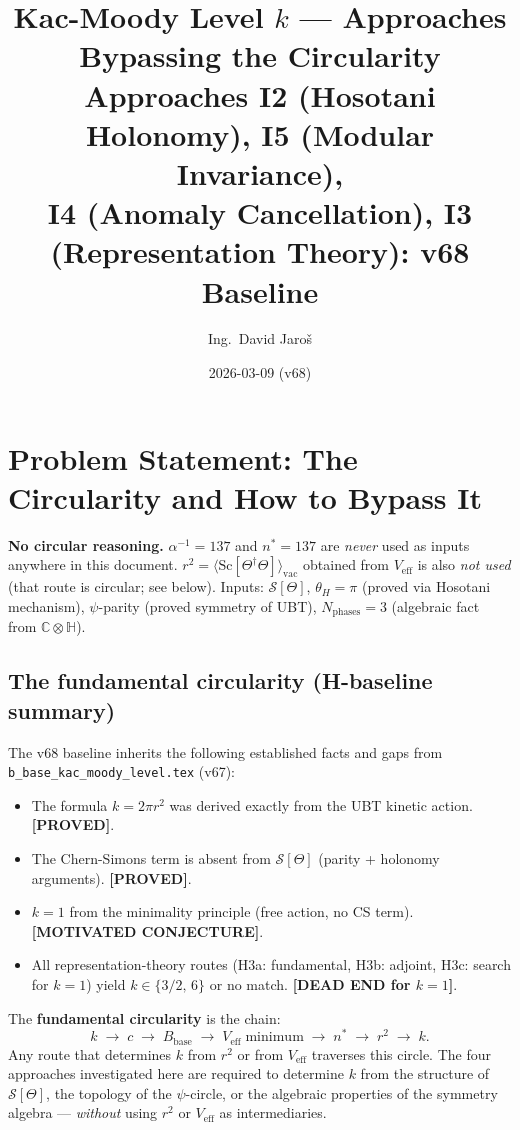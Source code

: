 \documentclass[11pt,a4paper]{article}
\title{Kac-Moody Level $k$ — Approaches Bypassing the Circularity\\
    \large Approaches I2 (Hosotani Holonomy), I5 (Modular Invariance),\\
    I4 (Anomaly Cancellation), I3 (Representation Theory): v68 Baseline}
\author{Ing.\ David Jaroš}
\date{2026-03-09 (v68)}
\theoremstyle{definition}
\theoremstyle{remark}
\begin{document}
  \maketitle
\fi

\section{Problem Statement: The Circularity and How to Bypass It}
\label{sec:intro}

\noindent\textbf{No circular reasoning.}
$\alpha^{-1} = 137$ and $n^* = 137$ are \emph{never} used as inputs
anywhere in this document.
$r^2 = \langle\mathrm{Sc}[\Theta^\dagger\Theta]\rangle_{\mathrm{vac}}$
obtained from $V_{\mathrm{eff}}$ is also \emph{not used} (that route
is circular; see below).
Inputs: $\mathcal{S}[\Theta]$, $\theta_H = \pi$ (proved via Hosotani
mechanism), $\psi$-parity (proved symmetry of UBT), $N_{\mathrm{phases}} = 3$
(algebraic fact from $\mathbb{C}\otimes\mathbb{H}$).

\subsection{The fundamental circularity (H-baseline summary)}

The v68 baseline inherits the following established facts and gaps from
\texttt{b\_base\_kac\_moody\_level.tex} (v67):

\begin{itemize}
  \item The formula $k = 2\pi r^2$ was derived exactly from the UBT
    kinetic action. \textbf{[PROVED]}.
  \item The Chern-Simons term is absent from $\mathcal{S}[\Theta]$
    (parity + holonomy arguments). \textbf{[PROVED]}.
  \item $k = 1$ from the minimality principle (free action,
    no CS term). \textbf{[MOTIVATED CONJECTURE]}.
  \item All representation-theory routes (H3a: fundamental, H3b: adjoint,
    H3c: search for $k=1$) yield $k \in \{3/2,\,6\}$ or no match.
    \textbf{[DEAD END for $k=1$]}.
\end{itemize}

The \textbf{fundamental circularity} is the chain:
\[
  k \;\longrightarrow\; c \;\longrightarrow\; B_{\mathrm{base}}
  \;\longrightarrow\; V_{\mathrm{eff}}\;\text{minimum}
  \;\longrightarrow\; n^* \;\longrightarrow\; r^2 \;\longrightarrow\; k.
\]
Any route that determines $k$ from $r^2$ or from $V_{\mathrm{eff}}$ traverses
this circle.  The four approaches investigated here are required to
determine $k$ from the structure of $\mathcal{S}[\Theta]$, the
topology of the $\psi$-circle, or the algebraic properties of the
symmetry algebra — \emph{without} using $r^2$ or $V_{\mathrm{eff}}$
as intermediaries.
\end{document}
